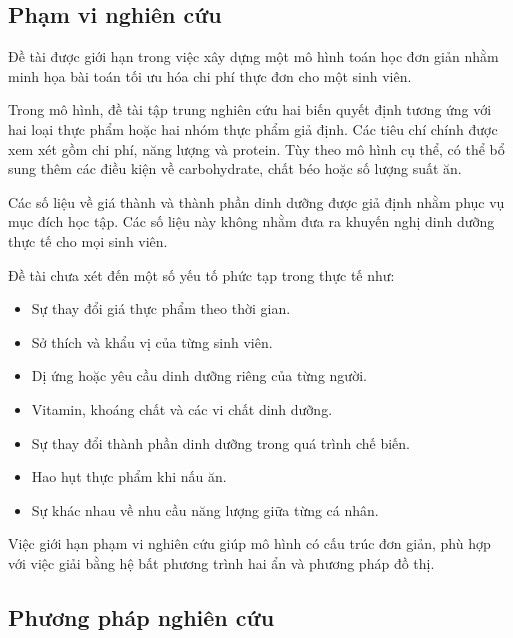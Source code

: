 \documentclass[12pt,a4paper]{article}
\begin{document}

\subsection{Phạm vi nghiên cứu}

Đề tài được giới hạn trong việc xây dựng một mô hình toán học đơn giản nhằm minh họa bài toán tối ưu hóa chi phí thực đơn cho một sinh viên.

Trong mô hình, đề tài tập trung nghiên cứu hai biến quyết định tương ứng với hai loại thực phẩm hoặc hai nhóm thực phẩm giả định. Các tiêu
chí chính được xem xét gồm chi phí, năng lượng và protein. Tùy theo mô hình cụ thể, có thể bổ sung thêm các điều kiện về carbohydrate, chất béo hoặc số lượng suất ăn.

Các số liệu về giá thành và thành phần dinh dưỡng được giả định nhằm phục vụ mục đích học tập. Các số liệu này không nhằm đưa ra khuyến nghị dinh dưỡng thực tế cho mọi sinh viên.

Đề tài chưa xét đến một số yếu tố phức tạp trong thực tế như:

\begin{itemize}
    \item Sự thay đổi giá thực phẩm theo thời gian.
    \item Sở thích và khẩu vị của từng sinh viên.
    \item Dị ứng hoặc yêu cầu dinh dưỡng riêng của từng người.
    \item Vitamin, khoáng chất và các vi chất dinh dưỡng.
    \item Sự thay đổi thành phần dinh dưỡng trong quá trình chế biến.
    \item Hao hụt thực phẩm khi nấu ăn.
    \item Sự khác nhau về nhu cầu năng lượng giữa từng cá nhân.
\end{itemize}

Việc giới hạn phạm vi nghiên cứu giúp mô hình có cấu trúc đơn giản, phù hợp với việc giải bằng hệ bất phương trình hai ẩn và phương pháp đồ thị.



\subsection{Phương pháp nghiên cứu}
\end{document}
